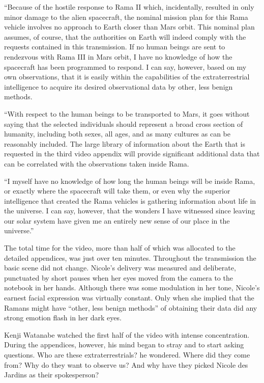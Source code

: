\documentclass[]{article}
\begin{document}
{“Because of the hostile response to Rama II which, incidentally, resulted in only minor damage to the alien spacecraft, the nominal mission plan for this Rama vehicle involves no approach to Earth closer than Mars orbit. This nominal plan assumes, of course, that the authorities on Earth will indeed comply with the requests contained in this transmission. If no human beings are sent to rendezvous with Rama III in Mars orbit, I have no knowledge of how the spacecraft has been programmed to respond. I can say, however, based on my own observations, that it is easily within the capabilities of the extraterrestrial intelligence to acquire its desired observational data by other, less benign methods.

“With respect to the human beings to be transported to Mars, it goes without saying that the selected individuals should represent a broad cross section of humanity, including both sexes, all ages, and as many cultures as can be reasonably included. The large library of information about the Earth that is requested in the third video appendix will provide significant additional data that can be correlated with the observations taken inside Rama.

“I myself have no knowledge of how long the human beings will be inside Rama, or exactly where the spacecraft will take them, or even why the superior intelligence that created the Rama vehicles is gathering information about life in the universe. I can say, however, that the wonders I have witnessed since leaving our solar system have given me an entirely new sense of our place in the universe.”

The total time for the video, more than half of which was allocated to the detailed appendices, was just over ten minutes. Throughout the transmission the basic scene did not change. Nicole’s delivery was measured and deliberate, punctuated by short pauses when her eyes moved from the camera to the notebook in her hands. Although there was some modulation in her tone, Nicole’s earnest facial expression was virtually constant. Only when she implied that the Ramans might have “other, less benign methods” of obtaining their data did any strong emotion flash in her dark eyes.

Kenji Watanabe watched the first half of the video with intense concentration. During the appendices, however, his mind began to stray and to start asking questions. Who are these extraterrestrials? he wondered. Where did they come from? Why do they want to observe us? And why have they picked Nicole des Jardins as their spokesperson?

}
\end{document}
